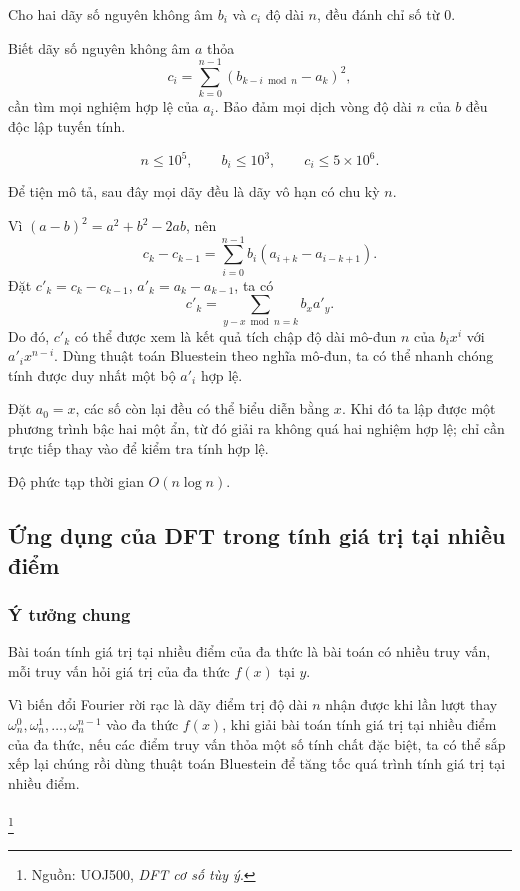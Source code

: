 \documentclass[11pt]{article}
\begin{document}
 Cho hai dãy số nguyên không âm \(b_i\) và \(c_i\) độ dài \(n\),
đều đánh chỉ số từ \(0\).

Biết dãy số nguyên không âm \(a\) thỏa
\[
c_i=\sum_{k=0}^{n-1}(b_{k-i\bmod n}-a_k)^2,
\]
cần tìm mọi nghiệm hợp lệ của \(a_i\). Bảo đảm mọi dịch vòng độ dài \(n\) của
\(b\) đều độc lập tuyến tính.

\[
n\le 10^5,\qquad b_i\le 10^3,\qquad c_i\le 5\times 10^6.
\]

 Để tiện mô tả, sau đây mọi dãy đều là dãy vô hạn có chu kỳ
\(n\).

Vì \((a-b)^2=a^2+b^2-2ab\), nên
\[
c_k-c_{k-1}=\sum_{i=0}^{n-1}b_i(a_{i+k}-a_{i-k+1}).
\]
Đặt \(c'_k=c_k-c_{k-1}\), \(a'_k=a_k-a_{k-1}\), ta có
\[
c'_k=\sum_{y-x\bmod n=k}b_xa'_y.
\]
Do đó, \(c'_k\) có thể được xem là kết quả tích chập độ dài mô-đun \(n\) của
\(b_i x^i\) với \(a'_i x^{n-i}\). Dùng thuật toán Bluestein theo nghĩa mô-đun,
ta có thể nhanh chóng tính được duy nhất một bộ \(a'_i\) hợp lệ.

Đặt \(a_0=x\), các số còn lại đều có thể biểu diễn bằng \(x\). Khi đó ta lập
được một phương trình bậc hai một ẩn, từ đó giải ra không quá hai nghiệm hợp
lệ; chỉ cần trực tiếp thay vào để kiểm tra tính hợp lệ.

Độ phức tạp thời gian \(O(n\log n)\).

\subsection{Ứng dụng của DFT trong tính giá trị tại nhiều điểm}

\subsubsection{Ý tưởng chung}

Bài toán tính giá trị tại nhiều điểm của đa thức là bài toán có nhiều truy vấn,
mỗi truy vấn hỏi giá trị của đa thức \(f(x)\) tại \(y\).

Vì biến đổi Fourier rời rạc là dãy điểm trị độ dài \(n\) nhận được khi lần lượt
thay \(\omega_n^0,\omega_n^1,\ldots,\omega_n^{n-1}\) vào đa thức \(f(x)\), khi
giải bài toán tính giá trị tại nhiều điểm của đa thức, nếu các điểm truy vấn
thỏa một số tính chất đặc biệt, ta có thể sắp xếp lại chúng rồi dùng thuật toán
Bluestein để tăng tốc quá trình tính giá trị tại nhiều điểm.

\paragraph{}\footnote{Nguồn: UOJ500, \emph{DFT cơ số tùy ý}.}
\end{document}
